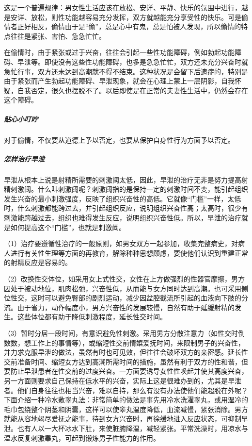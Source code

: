 这是一个普遍规律：男女性生活应该在放松、安详、平静、快乐的氛围中进行，越是安详、放松，则性功能越容易充分发挥，双方就越能充分享受性的快乐。可是偷情者正好相反，偷情由于是“偷”，总是心中有鬼，总是怕被人发现，所以偷情的特点往往是紧张、害怕、急急忙忙。

在偷情时，由于紧张或过于兴奋，往往会引起一些性功能障碍，例如勃起功能障碍、早泄等。即使没有这些性功能障碍，也多是急急忙忙，双方还未充分兴奋时就急忙行事，双方还未达到高潮就不得不结束。这种状况是会留下后遗症的，特别是由于紧张而产生勃起功能障碍、早泄现象，就会在心理上蒙上一层阴影，自我怀疑，自我否定，很久也摆脱不了。以后即使是在正常的夫妻性生活中，仍然会存在这个障碍。

\subparagraph{贴心小叮咛}

对于偷情，不仅要从道德上予以否定，也要从保护自身性行为方面予以否定。

\subparagraph{怎样治疗早泄}

早泄从根本上说是射精所需要的刺激阈太低，因此，早泄的治疗无非是努力提高射精刺激阈。什么叫刺激阈呢？刺激阈指的是保持一定的刺激时间不变，能引起组织发生兴奋的最小刺激强度，反映了组织兴奋性的高低。它就像“门槛”一样，太低时，什么刺激都能跨过去，并引起组织反应，说明组织兴奋性高；太高时，很少有刺激能跨越过去，组织也难得发生反应，说明组织兴奋性低。所以，早泄的治疗就是如何提高这个“门槛”，也就是刺激阈。

（1）治疗要遵循性治疗的一般原则，如男女双方一起参加，收集完整病史，对病人进行有关性生理等方面的再教育，解除种种思想顾虑，要使他们认识到重建正常的射精反应是容易的。

（2）改换性交体位，如采用女上式性交，女性在上方做强烈的性器官摩擦，男方因处于被动地位，肌肉松弛，兴奋性低，从而能与女方同时达到高潮。也可采用侧位性交，这时可以避免臀部的剧烈运动，减少因盆腔截流所引起的血液向下肢的分流。由于省力，动作幅度小，男方兴奋性的发展较慢，自然有助于延缓射精的发生。这些体位都有助于降低刺激程度，延长性交时间。

（3）暂时分居一段时间，有意识避免性刺激。采用男方分散注意力（如性交时倒数数，想工作上的事情等），或缩短性交前情嬉爱抚时间，来限制男子的兴奋性，并力求克服早泄的做法，虽然有时也可见效，但往往会破坏双方的亲密感。延长性交前准备时间、缩短女方达到高潮所需时间的措施，虽然有利于双方的性和谐，但要防止早泄患者在性交前的过度兴奋。一方面要诱导女性性唤起并使其高度兴奋，另一方面则要求自己保持在低水平的兴奋，实际上这是很难办到的，尤其是早泄者。他们自身往往也相当兴奋，难以自持，那么有没有办法使他们能超脱在外呢？下面介绍一种冷水敷睾丸法：非常简单的做法是事先用冷水洗濯睾丸，或用湿冷的毛巾包绕整个阴茎和阴囊，这样可以使睾丸温度降低，血流减慢，紧张消除。男方就能从容地竭尽爱抚之能事，待到女方兴奋时，再徐缓地进入反应状态，可抑制早泄。也有人以一大杯冰水下肚，来使脏腑降温，减轻紧张。平常洗澡时，用凉水与温水反复刺激睾丸，可起到锻炼男子性能力的作用。


